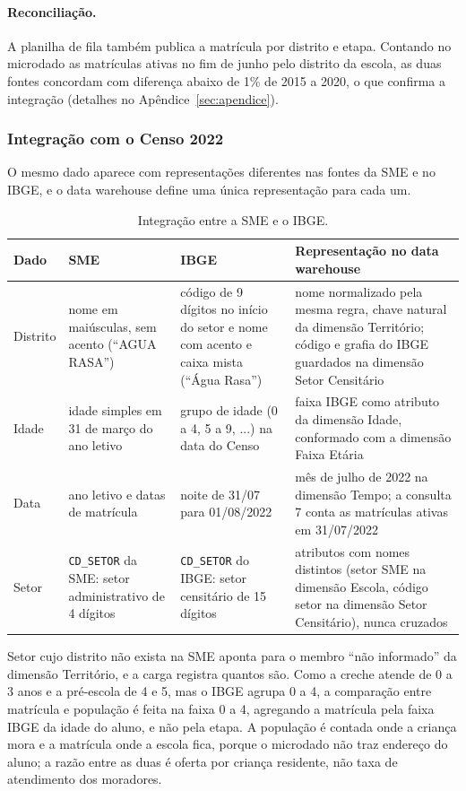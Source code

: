\documentclass[11pt,a4paper]{article}
\newcommand{\cod}[1]{\texttt{#1}}
\begin{document}
\paragraph{Reconciliação.} A planilha de fila também publica a matrícula por distrito e etapa. Contando no microdado as matrículas ativas no fim de junho pelo distrito da escola, as duas fontes concordam com diferença abaixo de 1\% de 2015 a 2020, o que confirma a integração (detalhes no Apêndice~\ref{sec:apendice}).

\subsubsection{Integração com o Censo 2022}

O mesmo dado aparece com representações diferentes nas fontes da SME e no IBGE, e o data warehouse define uma única representação para cada um.

\begin{table}[H]\centering\small
\begin{tabularx}{\linewidth}{>{\raggedright}p{2.0cm}>{\raggedright}X>{\raggedright}X>{\raggedright\arraybackslash}X}
\toprule\textbf{Dado} & \textbf{SME} & \textbf{IBGE} & \textbf{Representação no data warehouse}\\\midrule
Distrito & nome em maiúsculas, sem acento (``AGUA RASA'') & código de 9 dígitos no início do setor e nome com acento e caixa mista (``Água Rasa'') & nome normalizado pela mesma regra, chave natural da dimensão Território; código e grafia do IBGE guardados na dimensão Setor Censitário \\
Idade & idade simples em 31 de março do ano letivo & grupo de idade (0 a 4, 5 a 9, ...) na data do Censo & faixa IBGE como atributo da dimensão Idade, conformado com a dimensão Faixa Etária \\
Data & ano letivo e datas de matrícula & noite de 31/07 para 01/08/2022 & mês de julho de 2022 na dimensão Tempo; a consulta 7 conta as matrículas ativas em 31/07/2022 \\
Setor & \cod{CD_SETOR} da SME: setor administrativo de 4 dígitos & \cod{CD_SETOR} do IBGE: setor censitário de 15 dígitos & atributos com nomes distintos (setor SME na dimensão Escola, código setor na dimensão Setor Censitário), nunca cruzados \\
\bottomrule\end{tabularx}
\caption{Integração entre a SME e o IBGE.}
\end{table}

Setor cujo distrito não exista na SME aponta para o membro ``não informado'' da dimensão Território, e a carga registra quantos são. Como a creche atende de 0 a 3 anos e a pré-escola de 4 e 5, mas o IBGE agrupa 0 a 4, a comparação entre matrícula e população é feita na faixa 0 a 4, agregando a matrícula pela faixa IBGE da idade do aluno, e não pela etapa. A população é contada onde a criança mora e a matrícula onde a escola fica, porque o microdado não traz endereço do aluno; a razão entre as duas é oferta por criança residente, não taxa de atendimento dos moradores.
\end{document}
